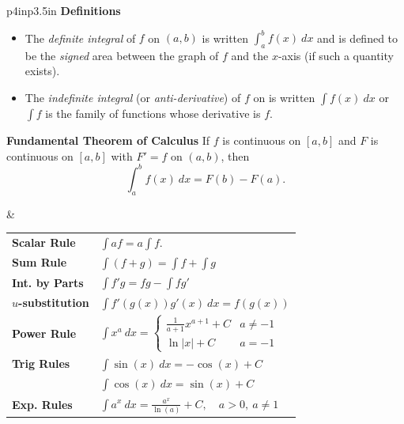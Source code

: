\documentclass{article}
\newenvironment{bx}[1][]{
\begin{tcolorbox}[colback=white!97!black, title=#1, arc=0in, halign=flush left, left=1mm, right=1mm,]
}{
\end{tcolorbox}
}
\begin{document}
\begin{bx}[Integration]
\begin{tabular}{p{4in}p{3.5in}}
\textbf{Definitions}
\begin{itemize}[leftmargin=1em]
    \item The \textit{definite integral} of $f$ on $(a,b)$ is written $\int_a^bf(x)\ dx$ and is defined to be the \textit{signed} area between the graph of $f$ and the $x$-axis (if such a quantity exists).
    \item The \textit{indefinite integral} (or \textit{anti-derivative}) of $f$ on is written $\int f(x)\ dx$ or $\int f$ is the family of functions whose derivative is $f$.
\end{itemize}

\vspace{0.5em}

\textbf{Fundamental Theorem of Calculus} If $f$ is continuous on $[a,b]$ and $F$ is continuous on $[a,b]$ with $F'=f$ on $(a,b)$, then
    $$\int_a^bf(x)\ dx = F(b)-F(a).$$


& 
\vspace{-2em}

\begin{center}
\def\arraystretch{1.5}
\begin{tabular}{@{}ll@{}}
\toprule[0.4mm]
\textbf{Scalar Rule} & $\int a f = a \int f$. \\
\textbf{Sum Rule} & $\int (f+g)=\int f+\int g$ \\
\textbf{Int. by Parts}
 & $\int f'g = fg - \int fg' $ \\
\textbf{$u$-substitution} & $\int f'(g(x))g'(x)\ dx =  f(g(x))$ \\
\midrule
\textbf{Power Rule}
 & $\displaystyle\int x^a \ dx = \begin{cases}
\frac{1}{a+1}x^{a+1} + C & a \neq -1\\
\ln|x| + C & a = -1
\end{cases}$ \\
\textbf{Trig Rules}  
& $\int \sin(x)\ dx = -\cos(x)+C$\\
& $\int \cos(x)\ dx = \sin(x)+C$ \\

\textbf{Exp. Rules} & $\int a^x\ dx = \frac{a^x}{\ln(a)}+C,\quad a>0,\ a\ne1$ \\
\bottomrule[0.4mm]
\end{tabular}
\end{center}
\\ 

\end{tabular}


\end{bx}
\end{document}
